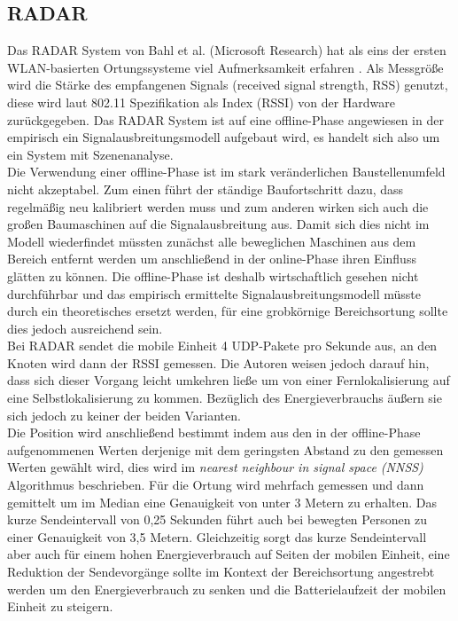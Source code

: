 \subsection{RADAR}
\label{ch:Vorherige:sec:RADAR}
Das RADAR System von Bahl et al. (Microsoft Research) hat als eins der ersten WLAN-basierten Ortungssysteme viel Aufmerksamkeit erfahren \cite{bahl2000radar}.
Als Messgröße wird die Stärke des empfangenen Signals (received signal strength, RSS) genutzt, diese wird laut 802.11 Spezifikation als Index (RSSI) von der Hardware zurückgegeben. 
Das RADAR System ist auf eine offline-Phase angewiesen in der empirisch ein Signalausbreitungsmodell aufgebaut wird, es handelt sich also um ein System mit Szenenanalyse.\\
Die Verwendung einer offline-Phase ist im stark veränderlichen Baustellenumfeld nicht akzeptabel. 
Zum einen führt der ständige Baufortschritt dazu, dass regelmäßig neu kalibriert werden muss und zum anderen wirken sich auch die großen Baumaschinen auf die Signalausbreitung aus. 
Damit sich dies nicht im Modell wiederfindet müssten zunächst alle beweglichen Maschinen aus dem Bereich entfernt werden um anschließend in der online-Phase ihren Einfluss glätten zu können.
Die offline-Phase ist deshalb wirtschaftlich gesehen nicht durchführbar und das empirisch ermittelte Signalausbreitungsmodell müsste durch ein theoretisches ersetzt werden, für eine grobkörnige Bereichsortung sollte dies jedoch ausreichend sein.\\
Bei RADAR sendet die mobile Einheit 4 UDP-Pakete pro Sekunde aus, an den Knoten wird dann der RSSI gemessen.
Die Autoren weisen jedoch darauf hin, dass sich dieser Vorgang leicht umkehren ließe um von einer Fernlokalisierung auf eine Selbstlokalisierung zu kommen.
Bezüglich des Energieverbrauchs äußern sie sich jedoch zu keiner der beiden Varianten.\\
Die Position wird anschließend bestimmt indem aus den in der offline-Phase aufgenommenen Werten derjenige mit dem geringsten Abstand zu den gemessen Werten gewählt wird, dies wird im \textit{nearest neighbour in signal space (NNSS)} Algorithmus beschrieben.
Für die Ortung wird mehrfach gemessen und dann gemittelt um im Median eine Genauigkeit von unter 3 Metern zu erhalten. 
Das kurze Sendeintervall von 0,25 Sekunden führt auch bei bewegten Personen zu einer Genauigkeit von 3,5 Metern.
Gleichzeitig sorgt das kurze Sendeintervall aber auch für einem hohen Energieverbrauch auf Seiten der mobilen Einheit, eine Reduktion der Sendevorgänge sollte im Kontext der Bereichsortung angestrebt werden um den Energieverbrauch zu senken und die Batterielaufzeit der mobilen Einheit zu steigern.


